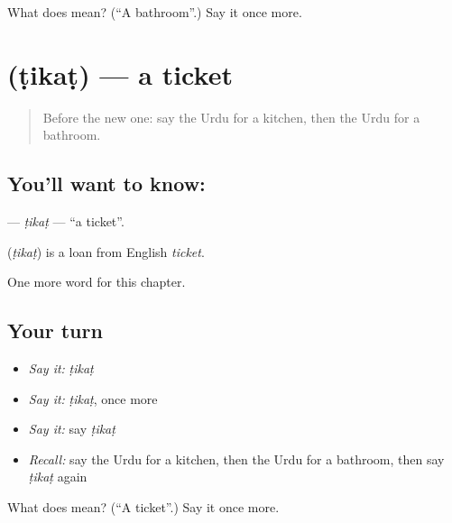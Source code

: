 \begin{tcolorbox}[breakable,colback=teal!4,colframe=teal!35!black,title={Before you move on}]
What does   mean? (\textquotedblleft{}A bathroom\textquotedblright{}.) Say it once more.
\end{tcolorbox}
\section[\texorpdfstring{\ur{ٹکٹ} (ṭikaṭ)}{ٹکٹ (ṭikaṭ)}]{ (ṭikaṭ) — a ticket}

\label{lesson:UR-C102-tikat}



\begin{quote}
Before the new one: say the Urdu for a kitchen, then the Urdu for a bathroom.
\end{quote}

\subsection*{You'll want to know: }
\textbf{} — \emph{ṭikaṭ} — \textquotedblleft{}a ticket\textquotedblright{}.

\begin{cousinweb}
\textbf{} (\emph{ṭikaṭ}) is a loan from English \emph{ticket}.
\end{cousinweb}

\begin{grammarlens}[title={What you've built}]
One more word for this chapter.
\end{grammarlens}

\subsection*{Your turn}
\begin{itemize}
\raggedright
  \item \emph{Say it:} \emph{ṭikaṭ}
  \item \emph{Say it:} \emph{ṭikaṭ}, once more
  \item \emph{Say it:} say \emph{ṭikaṭ}
  \item \emph{Recall:} say the Urdu for a kitchen, then the Urdu for a bathroom, then say \emph{ṭikaṭ} again
\end{itemize}

\begin{tcolorbox}[breakable,colback=teal!4,colframe=teal!35!black,title={Before you move on}]
What does  mean? (\textquotedblleft{}A ticket\textquotedblright{}.) Say it once more.
\end{tcolorbox}
